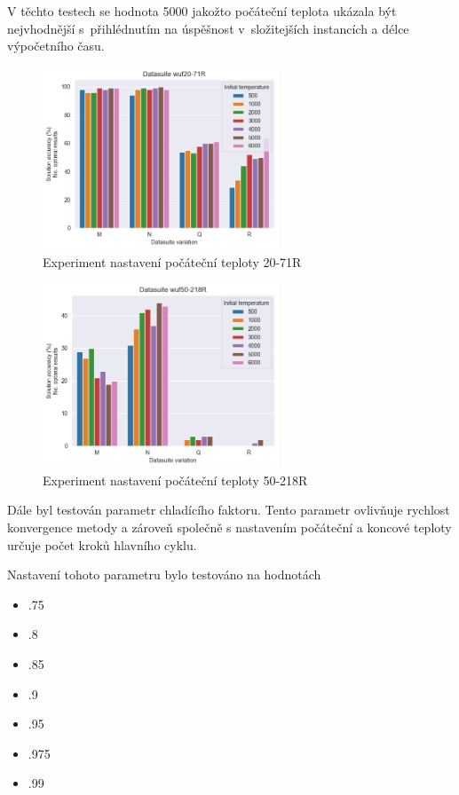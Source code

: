 \documentclass[twoside,twocolumn]{article}
\begin{document}
    V těchto testech se hodnota 5000 jakožto počáteční teplota ukázala být nejvhodnější s~přihlédnutím na úspěšnost
    v~složitejších instancích a délce výpočetního času.

    \begin{figure}
        \centering
        \includegraphics[width=7cm]{images/testing/initial_temperature/static_penalty_m5000/wuf20-71R}
        \caption{Experiment nastavení počáteční teploty 20-71R}
        \label{fig:initial_temperature_71}
    \end{figure}

    \begin{figure}
        \centering
        \includegraphics[width=7cm]{images/testing/initial_temperature/static_penalty_m5000/wuf50-218R}
        \caption{Experiment nastavení počáteční teploty 50-218R}
        \label{fig:initial_temperature_218R}
    \end{figure}

    Dále byl testován parametr chladícího faktoru.
    Tento parametr ovlivňuje rychlost konvergence metody a zároveň společně s nastavením počáteční a koncové teploty
    určuje počet kroků hlavního cyklu.

    Nastavení tohoto parametru bylo testováno na hodnotách

    \begin{itemize}
        \item .75
        \item .8
        \item .85
        \item .9
        \item .95
        \item .975
        \item .99
    \end{itemize}
\end{document}
